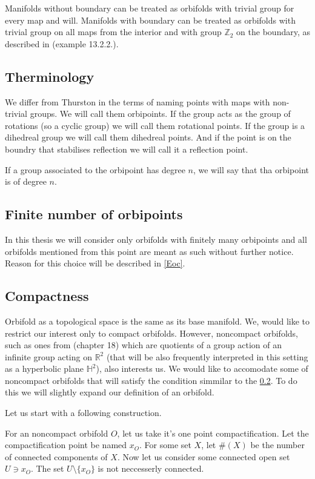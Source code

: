 
Manifolds without boundary can be treated as orbifolds with trivial group for every map and will. 
Manifolds with boundary can be treated as orbifolds with trivial group on all maps from the 
interior and with group $\mathbb{Z}_2$ on the boundary, as described in \cite{Thurston1979} 
(example 13.2.2.).

\subsection{Therminology}
We differ from Thurston in the terms of naming points with maps with non-trivial groups. 
We will call them orbipoints. If the group acts as the group of rotations (so a 
cyclic group) we will call them rotational points. If the group is a dihedreal group we will 
call them 
dihedreal points. And if the point is on the boundry that stabilises reflection we will call it a 
reflection point. 

If a group associated to the orbipoint has degree $n$, we will say that tha orbipoint is 
of degree $n$. 
\subsection{Finite number of orbipoints}\label{finite number of orbipoints}
In this thesis we will consider only orbifolds with finitely many orbipoints and all orbifolds 
mentioned from this point are meant as such without further notice. Reason for this 
choice will be described in \ref{Eoc}.  

\subsection{Compactness}\label{compactness}
Orbifold as a topological space is the same as its base manifold.
We, would like to restrict our interest only to compact orbifolds. 
However, noncompact orbifolds, such as ones from \cite{Conway2016} (chapter 18) 
which are quotients 
of a group action of an infinite group acting on $\mathbb{R}^2$ (that will 
be also frequently interpreted in this setting as a hyperbolic plane $\mathbb{H}^2$), 
also interests us. We would like to accomodate some of noncompact orbifolds that 
will satisfy the condition simmilar to the \ref{finite number of orbipoints}. 
To do this we will slightly expand our definition of an orbifold. 

Let us start with a following construction.

For an noncompact orbifold $O$, let us take it's one point compactification. 
Let the compactification point be named $x_O$.  
For some set $X$, let $\#(X)$ be the number of connected components of $X$.
Now let us consider some connected open set $U \ni x_O$. The set $U\setminus\{x_O\}$ is 
not neccesserly connected.
 
